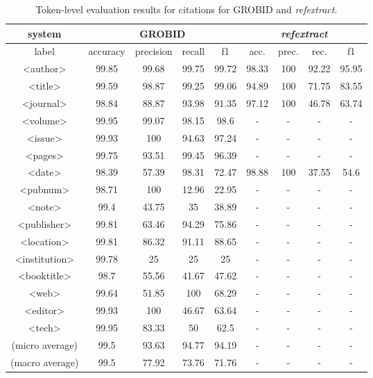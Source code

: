 \begin{table}[h]
\begin{center}
\begin{tabular}{|c|cccc|cccc|}
\hline
system &  \multicolumn{4}{c|}{GROBID} & \multicolumn{4}{c|}{\emph{refextract}}\\
\hline
label & accuracy & precision & recall & f1 & acc. & prec. & rec. & f1\\
\hline
<author>    & 99.85 &   99.68   &   99.75   &   99.72   & 98.33 &   100 &   92.22   &   95.95   \\
<title> &   99.59   &   98.87   &   99.25   &   99.06   & 94.89 &   100 &   71.75   &   83.55   \\
<journal>   & 98.84 &   88.87   &   93.98   &   91.35   & 97.12 &   100 &   46.78   &   63.74   \\
<volume>&   99.95   &   99.07   &   98.15   &   98.6    & -     &   -   &   -       &   -   \\
<issue> &   99.93   &   100     &   94.63   &   97.24   & -     &   -   &   -       &   -   \\
<pages> &   99.75   &   93.51   &   99.45   &   96.39   & -     &   -   &   -       &   -   \\
<date>  &   98.39   &   57.39   &   98.31   &   72.47   & 98.88 &   100 &   37.55   &   54.6    \\
<pubnum>&   98.71   &   100     &   12.96   &   22.95   & -     &   -   &   -       &   -   \\
<note>  &   99.4    &   43.75   &   35      &   38.89   & -     &   -   &   -       &   -   \\
<publisher>&99.81   &   63.46   &   94.29   &   75.86   & -     &   -   &   -       &   -   \\
<location>& 99.81   &   86.32   &   91.11   &   88.65   & -     &   -   &   -       &   -   \\
<institution>& 99.78&   25      &   25      &   25      & -     &   -   &   -       &   -   \\
<booktitle>&    98.7&   55.56   &   41.67   &   47.62   & -     &   -   &   -       &   -   \\
<web>   &   99.64   &   51.85   &   100     &   68.29   & -     &   -   &   -       &   -   \\
<editor>    &  99.93&   100     &	46.67   &   63.64   & -     &   -   &   -       &   -   \\
<tech>  &   99.95   &   83.33   &   50      &   62.5    & -     &   -   &   -       &   -   \\
\hline
(micro average) & 99.5  &   93.63   &   94.77   &   94.19 & -    &   - &   -   &   -   \\
(macro average) & 99.5  &   77.92   &   73.76   &   71.76 & -    &   -  &   -   &   -   \\
\hline
\end{tabular}
\caption[Token-level evaluation results of citation extraction for GROBID and \emph{refextract}.]{Token-level evaluation results for citations for GROBID and \emph{refextract}.}
\label{table:citationcomparison}
\end{center}
\end{table}

